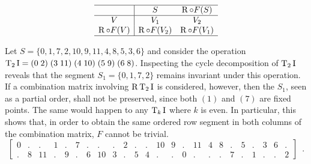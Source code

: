 \begin{equation}
\begin{array}{c|cc}
	\hline
    & S & \operatorname{R} \circ F(S) \\
    \hline
    V & V_1 & V_2 \\
    \operatorname{R} \circ F(V) & \operatorname{R} \circ F(V_2) & \operatorname{R} \circ F(V_1) \\
    \hline
\end{array}
\label{eq:derivation-retrograde}
\end{equation}

\vspace{12pt}

\begin{example}
    \cite[212]{Starr1984}
    \label{ex:derivation-unordered}
    Let $S = \{ 0, 1, 7, 2, 10, 9, 11, 4, 8, 5, 3, 6 \}$ and consider the operation $\operatorname{T}_2\operatorname{I} = (0 \; 2) \; (3 \; 11) \; (4 \; 10) \; (5 \; 9) \; (6 \; 8)$. Inspecting the cycle decomposition of $\operatorname{T}_2\operatorname{I}$ reveals that the segment $S_1 = \{ 0, 1, 7, 2 \}$ remains invariant under this operation. If a combination matrix involving $\operatorname{R}\operatorname{T}_2\operatorname{I}$ is considered, however, then the $S_1$, seen as a partial order, shall not be preserved, since both $(1)$ and $(7)$ are fixed points. The same would happen to any $\operatorname{T}_k\operatorname{I}$ where $k$ is even. In particular, this shows that, in order to obtain the same ordered row segment in both columns of the combination matrix, $F$ cannot be trivial.
	\begin{equation}
    	\left[
    	\begin{array}{cccccccccccc|cccccccccccc}
        	0 & . & . & 1 & . & 7 & . & . & . & 2 & . & . & 10 & 9 & . & 11 & 4 & 8 & . & 5 & . & 3 & 6 & . \\
        	. & 8 & 11 & . & 9 & . & 6 & 10 & 3 & . & 5 & 4 & . & . & 0 & . & . & . & 7 & . & 1 & . & . & 2
    	\end{array}
    	\right] \enspace.
	\end{equation}
\end{example}

